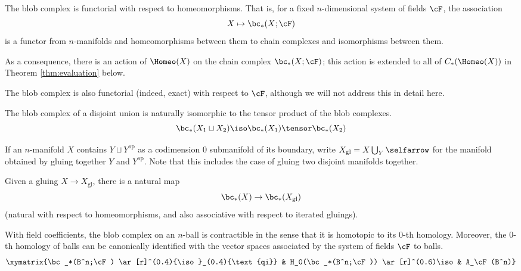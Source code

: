 \begin{property}[Functoriality]
\label{property:functoriality}%
The blob complex is functorial with respect to homeomorphisms.
That is, 
for a fixed $n$-dimensional system of fields $\cF$, the association
\begin{equation*}
X \mapsto \bc_*(X; \cF)
\end{equation*}
is a functor from $n$-manifolds and homeomorphisms between them to chain 
complexes and isomorphisms between them.
\end{property}
As a consequence, there is an action of $\Homeo(X)$ on the chain complex $\bc_*(X; \cF)$; 
this action is extended to all of $C_*(\Homeo(X))$ in Theorem \ref{thm:evaluation} below.

The blob complex is also functorial (indeed, exact) with respect to $\cF$, 
although we will not address this in detail here.

\begin{property}
\label{property:disjoint-union}
The blob complex of a disjoint union is naturally isomorphic to the tensor product of the blob complexes.
\begin{equation*}
\bc_*(X_1 \du X_2) \iso \bc_*(X_1) \tensor \bc_*(X_2)
\end{equation*}
\end{property}

If an $n$-manifold $X$ contains $Y \sqcup Y^\text{op}$ as a codimension $0$ submanifold of its boundary, 
write $X_\text{gl} = X \bigcup_{Y}\selfarrow$ for the manifold obtained by gluing together $Y$ and $Y^\text{op}$.
Note that this includes the case of gluing two disjoint manifolds together.
\begin{property}
\label{property:gluing-map}%
Given a gluing $X \to X_\mathrm{gl}$, there is
a natural map
\[
	\bc_*(X) \to \bc_*(X_\mathrm{gl}) 
\]
(natural with respect to homeomorphisms, and also associative with respect to iterated gluings).
\end{property}

\begin{property}[Contractibility]
\label{property:contractibility}%
With field coefficients, the blob complex on an $n$-ball is contractible in the sense 
that it is homotopic to its $0$-th homology.
Moreover, the $0$-th homology of balls can be canonically identified with the vector spaces 
associated by the system of fields $\cF$ to balls.
\begin{equation*}
\xymatrix{\bc_*(B^n;\cF) \ar[r]^(0.4){\iso}_(0.4){\text{qi}} & H_0(\bc_*(B^n;\cF)) \ar[r]^(0.6)\iso & A_\cF(B^n)}
\end{equation*}
\end{property}

